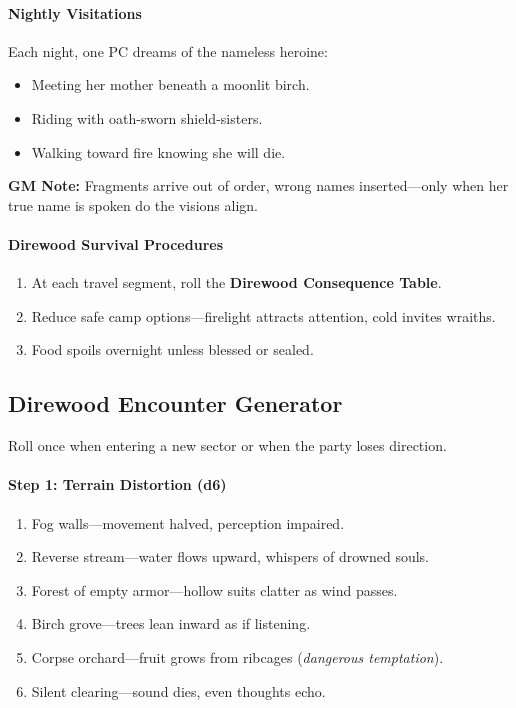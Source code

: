 \documentclass[11pt]{article}
\begin{document}
\paragraph{Nightly Visitations}
Each night, one PC dreams of the nameless heroine:
\begin{itemize}
    \item Meeting her mother beneath a moonlit birch.
    \item Riding with oath-sworn shield-sisters.
    \item Walking toward fire knowing she will die.
\end{itemize}

\textbf{GM Note:} Fragments arrive out of order, wrong names inserted---only when her true name is spoken do the visions align.

\paragraph{Direwood Survival Procedures}
\begin{enumerate}
  \item At each travel segment, roll the \textbf{Direwood Consequence Table}.
  \item Reduce safe camp options---firelight attracts attention, cold invites wraiths.
  \item Food spoils overnight unless blessed or sealed.
\end{enumerate}

\bigskip

\subsection*{Direwood Encounter Generator}
Roll once when entering a new sector or when the party loses direction.

\paragraph{Step 1: Terrain Distortion (d6)}
\begin{enumerate}
  \item Fog walls---movement halved, perception impaired.
  \item Reverse stream---water flows upward, whispers of drowned souls.
  \item Forest of empty armor---hollow suits clatter as wind passes.
  \item Birch grove---trees lean inward as if listening.
  \item Corpse orchard---fruit grows from ribcages (\emph{dangerous temptation}).
  \item Silent clearing---sound dies, even thoughts echo.
\end{enumerate}
\end{document}
